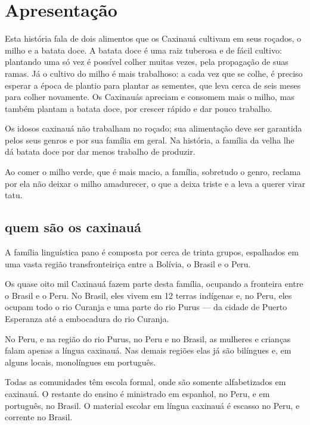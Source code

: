 \chapter{Apresentação}

Esta história fala de dois alimentos que os Caxinauá cultivam em seus roçados, o milho e a batata doce. A batata doce é uma raiz tuberosa e de fácil cultivo: plantando uma só vez é possível colher muitas vezes, pela propagação de suas ramas. Já o cultivo do milho é mais trabalhoso: a cada vez que se colhe, é preciso esperar a época de plantio para plantar as sementes, que leva cerca de seis meses para colher novamente. Os Caxinauás apreciam e consomem mais o milho, mas também plantam a batata doce, por crescer rápido e dar pouco trabalho.

Os idosos caxinauá não trabalham no roçado; sua alimentação deve ser garantida pelos seus genros e por sua família em geral. Na história, a família da velha lhe dá batata doce
por dar menos trabalho de produzir.

Ao comer o milho verde, que é mais macio, a família, sobretudo o genro, reclama por ela não deixar o milho amadurecer, o que a deixa triste e a leva a querer virar tatu.

\section{quem são os caxinauá}

A família linguística pano é composta por cerca de trinta grupos, espalhados em uma vasta região transfronteiriça entre a Bolívia, o Brasil e o Peru.

Os quase oito mil Caxinauá fazem parte desta família, ocupando a fronteira entre o Brasil
e o Peru. No Brasil, eles vivem em 12 terras indígenas e, no Peru, eles ocupam todo o rio Curanja e uma parte do rio Purus --- da cidade de Puerto Esperanza até a embocadura
do rio Curanja.

No Peru, e na região do rio Purus, no Peru e no Brasil, as mulheres e crianças falam apenas a língua caxinauá. Nas demais regiões elas já são bilíngues e, em alguns locais,
monolíngues em português.

Todas as comunidades têm escola formal, onde são somente alfabetizados em caxinauá. O
restante do ensino é ministrado em espanhol, no Peru, e em português, no Brasil. O material escolar em língua caxinauá é escasso no Peru, e corrente no Brasil.